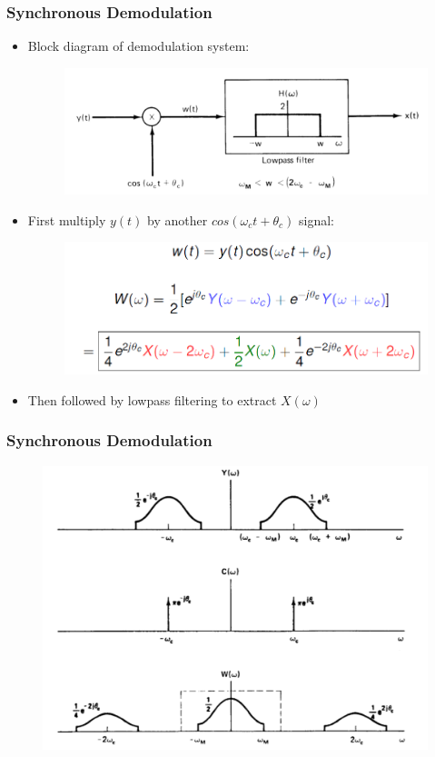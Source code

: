 \documentclass{beamer}
\begin{document}
\begin{frame}
\frametitle{Synchronous Demodulation}
\begin{itemize}
\item Block diagram of demodulation system:
\begin{figure}
\includegraphics[width=0.7\linewidth]{demod1}
\end{figure}
\item First multiply $y(t)$ by another $cos(\omega_ct + \theta_c)$ signal:
\begin{figure}
\includegraphics[width=0.6\linewidth]{demod2}
\end{figure}
\item Then followed by lowpass filtering to extract $ X(\omega)$
\end{itemize}
\end{frame}

\begin{frame}
\frametitle{Synchronous Demodulation}
\begin{figure}
\includegraphics[width=0.8\linewidth]{demod3}
\end{figure}
\end{frame}
\end{document}
